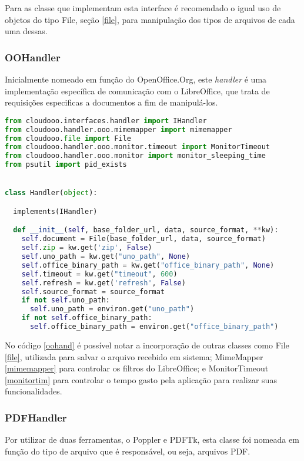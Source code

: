 Para as classe que implementam esta interface é recomendado o igual uso de objetos do tipo File, seção \ref{file}, para manipulação dos tipos de arquivos de cada uma dessas.


\subsubsection{OOHandler}

Inicialmente nomeado em função do OpenOffice.Org, este \textit{handler} é uma implementação específica de comunicação com o LibreOffice, que trata de requisições especificas a documentos a fim de manipulá-los.

{\singlespace
\begin{lstlisting}[caption=Trecho de criação da classe OOHandler,language=python,label={oohand}]
from cloudooo.interfaces.handler import IHandler
from cloudooo.handler.ooo.mimemapper import mimemapper
from cloudooo.file import File
from cloudooo.handler.ooo.monitor.timeout import MonitorTimeout
from cloudooo.handler.ooo.monitor import monitor_sleeping_time
from psutil import pid_exists


class Handler(object):

  implements(IHandler)

  def __init__(self, base_folder_url, data, source_format, **kw):
    self.document = File(base_folder_url, data, source_format)
    self.zip = kw.get('zip', False)
    self.uno_path = kw.get("uno_path", None)
    self.office_binary_path = kw.get("office_binary_path", None)
    self.timeout = kw.get("timeout", 600)
    self.refresh = kw.get('refresh', False)
    self.source_format = source_format
    if not self.uno_path:
      self.uno_path = environ.get("uno_path")
    if not self.office_binary_path:
      self.office_binary_path = environ.get("office_binary_path")
\end{lstlisting}
}

No código \ref{oohand} é possível notar a incorporação de outras classes como File \ref{file}, utilizada para salvar o arquivo recebido em sistema; MimeMapper \ref{mimemapper} para controlar os filtros do LibreOffice; e MonitorTimeout \ref{monitortim} para controlar o tempo gasto pela aplicação para realizar suas funcionalidades.

\subsubsection{PDFHandler}

Por utilizar de duas ferramentas, o Poppler e PDFTk, esta classe foi nomeada em função do tipo de arquivo que é responsável, ou seja, arquivos PDF.

